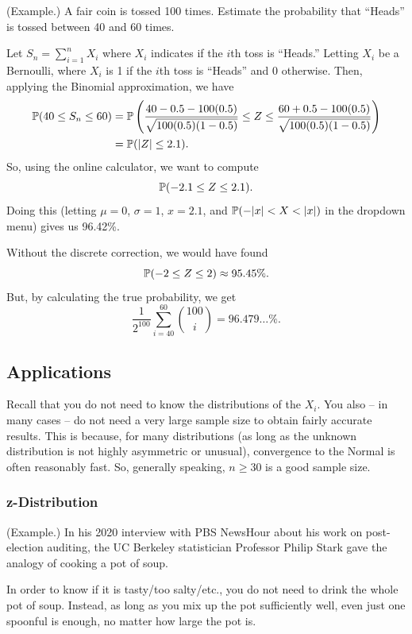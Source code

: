 \begin{mdframed}[]
    (Example.) A fair coin is tossed 100 times. Estimate the probability that ``Heads'' is tossed between 40 and 60 times. 

    \bigskip 

    Let $S_n = \sum_{i = 1}^{n} X_i$ where $X_i$ indicates if the $i$th toss is ``Heads.'' Letting $X_i$ be a Bernoulli, where $X_i$ is 1 if the $i$th toss is ``Heads'' and 0 otherwise. Then, applying the Binomial approximation, we have  
    \begin{equation*}
        \begin{aligned}
            \mathbb{P}(40 \leq S_n \leq 60) &= \mathbb{P}\left(\frac{40 - 0.5 - 100(0.5)}{\sqrt{100(0.5)(1 - 0.5)}} \leq Z \leq \frac{60 + 0.5 - 100(0.5)}{\sqrt{100(0.5)(1 - 0.5)}}\right) \\ 
                &= \mathbb{P}(|Z| \leq 2.1).
        \end{aligned}
    \end{equation*}
    So, using the online calculator, we want to compute 
    \[\mathbb{P}(-2.1 \leq Z \leq 2.1).\]
    Doing this (letting $\mu = 0$, $\sigma = 1$, $x = 2.1$, and $\mathbb{P}(-|x| < X < |x|)$ in the dropdown menu) gives us 96.42\%.

    \bigskip 

    Without the discrete correction, we would have found 
    \[\mathbb{P}(-2 \leq Z \leq 2) \approx 95.45\%.\]
    But, by calculating the true probability, we get 
    \[\frac{1}{2^{100}} \sum_{i = 40}^{60} \binom{100}{i} = 96.479\dots\%.\]
\end{mdframed}


\subsection{Applications}
Recall that you do not need to know the distributions of the $X_i$. You also -- in many cases -- do not need a very large sample size to obtain fairly accurate results. This is because, for many distributions (as long as the unknown distribution is not highly asymmetric or unusual), convergence to the Normal is often reasonably fast. So, generally speaking, $n \geq 30$ is a good sample size. 

\subsubsection{z-Distribution}
\begin{mdframed}[]
    (Example.) In his 2020 interview with PBS NewsHour about his work on post-election auditing, the UC Berkeley statistician Professor Philip Stark gave the analogy of cooking a pot of soup. 

    \bigskip 

    In order to know if it is tasty/too salty/etc., you do not need to drink the whole pot of soup. Instead, as long as you mix up the pot sufficiently well, even just one spoonful is enough, no matter how large the pot is. 
\end{mdframed}

